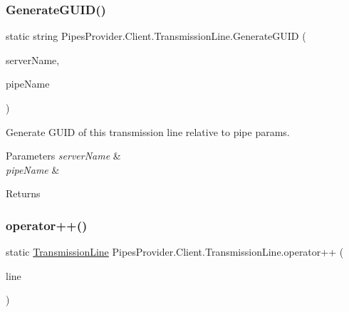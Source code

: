 \subsubsection{\texorpdfstring{Generate\+G\+U\+I\+D()}{GenerateGUID()}}
{\footnotesize\ttfamily static string Pipes\+Provider.\+Client.\+Transmission\+Line.\+Generate\+G\+U\+ID (\begin{DoxyParamCaption}\item[{string}]{server\+Name,  }\item[{string}]{pipe\+Name }\end{DoxyParamCaption})\hspace{0.3cm}{\ttfamily [static]}}



Generate G\+U\+ID of this transmission line relative to pipe params. 


\begin{DoxyParams}{Parameters}
{\em server\+Name} & \\
\hline
{\em pipe\+Name} & \\
\hline
\end{DoxyParams}
\begin{DoxyReturn}{Returns}

\end{DoxyReturn}
\mbox{\label{class_pipes_provider_1_1_client_1_1_transmission_line_ada994593c98fe9aa24abb0a3ab55e6e2}} 
\subsubsection{\texorpdfstring{operator++()}{operator++()}}
{\footnotesize\ttfamily static \mbox{\hyperlink{class_pipes_provider_1_1_client_1_1_transmission_line}{Transmission\+Line}} Pipes\+Provider.\+Client.\+Transmission\+Line.\+operator++ (\begin{DoxyParamCaption}\item[{\mbox{\hyperlink{class_pipes_provider_1_1_client_1_1_transmission_line}{Transmission\+Line}}}]{line }\end{DoxyParamCaption})\hspace{0.3cm}{\ttfamily [static]}}



